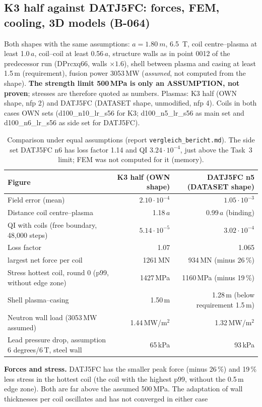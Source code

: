 \subsection{K3 half against DATJ5FC: forces, FEM, cooling, 3D models (B-064)}
Both shapes with the same assumptions: $a=\SI{1.80}{m}$, \SI{6.5}{T}, coil centre--plasma at least 1.0\,$a$, coil--coil at least 0.56\,$a$, structure walls as in point 0012 of the predecessor run (DPrcxq66, walls $\times1.6$),
shell between plasma and casing at least 1.5\,m (requirement), fusion power 3053\,MW (\emph{assumed}, not computed from the shape). \textbf{The strength limit 500\,MPa is only an ASSUMPTION, not proven}; stresses are therefore quoted as numbers.
Plasmas: K3 half (OWN shape, nfp 2) and DATJ5FC (DATASET shape, unmodified, nfp 4). Coils in both cases OWN sets (d100\_n10\_lr\_s56 for K3; d100\_n5\_lr\_s56 as main set and d100\_n6\_lr\_s56 as side set for DATJ5FC).
\begin{table}[H]\centering\small
\begin{tabularx}{\linewidth}{@{}Xrr@{}}\toprule
Figure & K3 half (OWN shape) & DATJ5FC n5 (DATASET shape) \\\midrule
Field error (mean) & $2.10\cdot10^{-4}$ & $1.05\cdot10^{-3}$ \\
Distance coil centre--plasma & 1.18\,$a$ & 0.99\,$a$ (binding) \\
QI with coils (free boundary, 48,000 steps) & $5.14\cdot10^{-5}$ & $3.02\cdot10^{-4}$ \\
Loss factor & 1.07 & 1.065 \\
largest net force per coil & 1261\,MN & 934\,MN (minus 26\,\%) \\
Stress hottest coil, round 0 (p99, without edge zone) & 1427\,MPa & 1160\,MPa (minus 19\,\%) \\
Shell plasma--casing & 1.50\,m & 1.28\,m (below requirement 1.5\,m) \\
Neutron wall load (3053\,MW assumed) & 1.44\,MW/m$^2$ & 1.32\,MW/m$^2$ \\
Lead pressure drop, assumption 6 degrees/6\,T, steel wall & 65\,kPa & 93\,kPa \\\bottomrule
\end{tabularx}\caption{Comparison under equal assumptions (report \texttt{vergleich\_bericht.md}). The side set DATJ5FC n6 has loss factor 1.14 and QI $3.24\cdot10^{-4}$, just above the Task~3 limit; FEM was not computed for it (memory).}\end{table}
\textbf{Forces and stress.} DATJ5FC has the smaller peak force (minus 26\,\%) and 19\,\% less stress in the hottest coil (the coil with the highest p99, without the 0.5\,m edge zone). Both are far above the assumed 500\,MPa. The adaptation of wall thicknesses per coil oscillates and has not converged in either case
